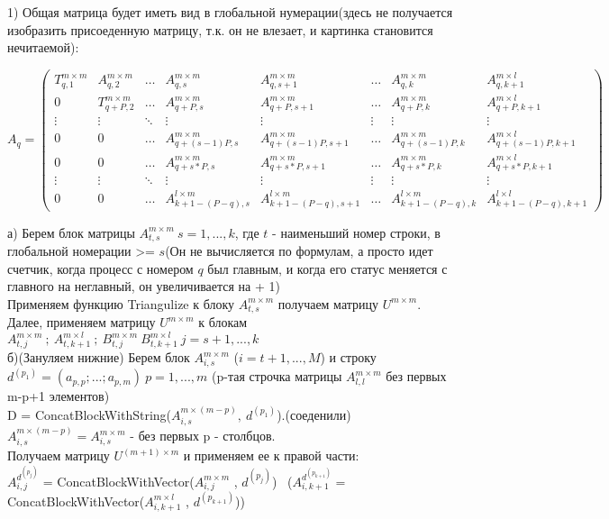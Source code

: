 \documentclass[a4paper,12pt]{article}
\begin{document}
1) Общая матрица будет иметь вид в глобальной нумерации(здесь не получается изобразить присоеденную матрицу, т.к. он не влезает, и картинка становится нечитаемой):

$$A_{q}=
   \begin{pmatrix}
     T_{q,1}^{m\times m}& A_{q,2}^{m\times m} &\dots & A_{q,s}^{m \times m} &  A_{q,s+1}^{m \times m}& \dots& A_{q,k}^{m\times m} & A_{q,k+1}^{m\times l}\\
     
     0& T_{q+P,2}^{m\times m} &\ldots & A_{q+P,s}^{m \times m} &  A_{q+P,s+1}^{m \times m}& \dots& A_{q+P,k}^{m\times m} & A_{q+P,k+1}^{m\times l} \\
     
     \vdots& \vdots &\ddots & \vdots & \vdots & \vdots & \vdots & \vdots  \\
     
     0& 0 &\ldots & A_{q+(s-1)P,s}^{m \times m} &  A_{q+(s-1)P,s+1}^{m \times m}& \dots& A_{q+(s-1)P,k}^{m\times m} & A_{q+(s-1)P,k+1}^{m\times l}\\

     0& 0 &\ldots & A_{q+s*P,s}^{m \times m} &  A_{q+s*P,s+1}^{m \times m}& \dots& A_{q+s*P,k}^{m\times m} & A_{q+s*P,k+1}^{m\times l}\\

    \vdots& \vdots &\ddots & \vdots & \vdots & \vdots & \vdots & \vdots  \\

    0& 0 &\ldots & A_{k+1-(P-q),s}^{l \times m} &  A_{k+1-(P-q),s+1}^{l \times m}& \dots& A_{k+1-(P-q),k}^{l\times m} & A_{k+1-(P-q),k+1}^{l\times l}
    \end{pmatrix}
$$ 

а) Берем блок матрицы  $A_{t,s}^{m\times m} \ s = 1,...,k$, где $t$ - наименьший номер строки, в глобальной номерации >= $s$(Он не вычисляется по формулам, а просто идет счетчик, когда процесс с номером $q$ был главным, и когда его статус меняется с главного на неглавный, он увеличивается на + 1)\\
Применяем функцию Triangulize к блоку $A_{t,s}^{m\times m} $ получаем матрицу $U^{m\times m}$. \\
Далее, применяем матрицу $U^{m\times m}$ к блокам $A_{t,j}^{m\times m} \ ; \ A_{t,k+1}^{m\times l} \ ; \ B_{t,j}^{m\times m}\ B_{t,k+1}^{m\times l} \ j = s+1,...,k$  \\

б)(Зануляем нижние) Берем блок $A_{i,s}^{{m\times m}}$ ($i = t + 1,...,M$) и строку $d^{(p_{1})} =(a_{p,p};...;a_{p,m}) \ p = 1,...,m$ (p-тая строчка матрицы $A_{l,l}^{m\times m}$ без первых m-p+1 элементов) \\
D = ConcatBlockWithString($A_{i,s}^{{m\times (m-p)}}, \ d^{(p_{1})}$).(соеденили) \
$A_{i,s}^{m\times (m-p)} = A_{i,s}^{m\times m}$ - без первых p - столбцов.\\
Получаем матрицу $U^{(m+1)\times m}$ и применяем ее к правой части:\\
$A_{i,j}^{d^{(p_{j})}}$ =  ConcatBlockWithVector($A_{i,j}^{m\times m}$ , $d^{(p_{j})}$) \ ($A_{i,k+1}^{d^{(p_{k+1})}} = $   ConcatBlockWithVector($A_{i,k+1}^{m\times l}$ , $d^{(p_{k+1})}$)) \\
\end{document}
